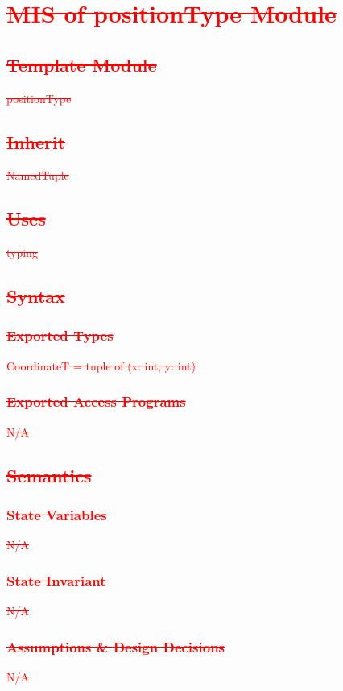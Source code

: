 \documentclass[12pt, titlepage]{article}
\DeclareRobustCommand{\hsout}[1]{\texorpdfstring{\sout{#1}}{#1}}
\begin{document}
\section{\textcolor{red}{\hsout{MIS of positionType Module}}}
        \subsection{\textcolor{red}{\hsout{Template Module}}}
        \textcolor{red}{\sout{positionType}}
        \subsection{\textcolor{red}{\hsout{Inherit}}}
        \textcolor{red}{\sout{NamedTuple}}
        \subsection{\textcolor{red}{\hsout{Uses}}}
        \textcolor{red}{\sout{typing}}
		\subsection{\textcolor{red}{\hsout{Syntax}}}
		\subsubsection{\textcolor{red}{\hsout{Exported Types}}}
			\textcolor{red}{\sout{CoordinateT = tuple of (x: int, y: int)}}
		\subsubsection{\textcolor{red}{\hsout{Exported Access Programs}}}
		\textcolor{red}{\sout{N/A}}
		\subsection{\textcolor{red}{\hsout{Semantics}}}
		
		\subsubsection{\textcolor{red}{\hsout{State Variables}}}
		\textcolor{red}{\sout{N/A}}
		\subsubsection{\textcolor{red}{\hsout{State Invariant}}}
		\textcolor{red}{\sout{N/A}}
		
		\subsubsection{\textcolor{red}{\hsout{Assumptions \& Design Decisions}}}
		\textcolor{red}{\sout{N/A}}
\end{document}
